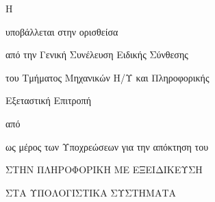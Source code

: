 \thispagestyle{empty}
\makeatletter
{\LARGE \@title}
\par
\vspace{2.5cm} {\Large Η \csethesisTypeEl}

\vspace{1.25cm} {\Large υποβάλλεται στην ορισθείσα}

\vspace{0.75cm} {\Large από την Γενική Συνέλευση Ειδικής Σύνθεσης}

\vspace{0.25cm} {\Large του Τμήματος Μηχανικών Η/Υ και Πληροφορικής}

\vspace{0.25cm} {\Large Εξεταστική Επιτροπή}

\vspace{1.25cm} {\Large από \@Arthro}

\vspace{1.75cm} {\LARGE \@author}

\vspace{1.25cm} {\Large ως μέρος των Υποχρεώσεων για την απόκτηση του}

\vspace{1.75cm} {\Large \csediplwmaEl}

\vspace{0.5cm} {\Large ΣΤΗΝ ΠΛΗΡΟΦΟΡΙΚΗ
 ΜΕ ΕΞΕΙΔΙΚΕΥΣΗ} %

\vspace{0.5cm} {\Large ΣΤΑ ΥΠΟΛΟΓΙΣΤΙΚΑ ΣΥΣΤΗΜΑΤΑ} %
\par
\vfill {\Large \@date}
\clearpage
